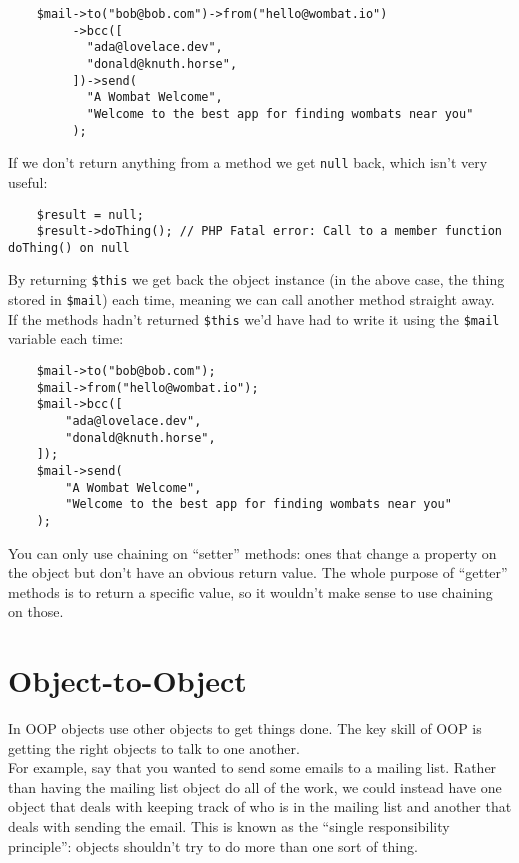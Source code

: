 \begin{verbatim}
    $mail->to("bob@bob.com")->from("hello@wombat.io")
         ->bcc([
           "ada@lovelace.dev",
           "donald@knuth.horse",
         ])->send(
           "A Wombat Welcome",
           "Welcome to the best app for finding wombats near you"
         );
\end{verbatim}

If we don't return anything from a method we get \texttt{null} back, which isn't very useful:

\begin{verbatim}
    $result = null;
    $result->doThing(); // PHP Fatal error: Call to a member function doThing() on null
\end{verbatim}

By returning \texttt{\$this} we get back the object instance (in the above case, the thing stored in \texttt{\$mail}) each time, meaning we can call another method straight away.
\\

If the methods hadn't returned \texttt{\$this} we'd have had to write it using the \texttt{\$mail} variable each time:

\begin{verbatim}
    $mail->to("bob@bob.com");
    $mail->from("hello@wombat.io");
    $mail->bcc([
        "ada@lovelace.dev",
        "donald@knuth.horse",
    ]);
    $mail->send(
        "A Wombat Welcome",
        "Welcome to the best app for finding wombats near you"
    );
\end{verbatim}

You can only use chaining on ``setter'' methods: ones that change a property on the object but don't have an obvious return value. The whole purpose of ``getter'' methods is to return a specific value, so it wouldn't make sense to use chaining on those.



\section{Object-to-Object}

In OOP objects use other objects to get things done. The key skill of OOP is getting the right objects to talk to one another.
\\

For example, say that you wanted to send some emails to a mailing list. Rather than having the mailing list object do all of the work, we could instead have one object that deals with keeping track of who is in the mailing list and another that deals with sending the email. This is known as the ``single responsibility principle'': objects shouldn't try to do more than one sort of thing.
\\

